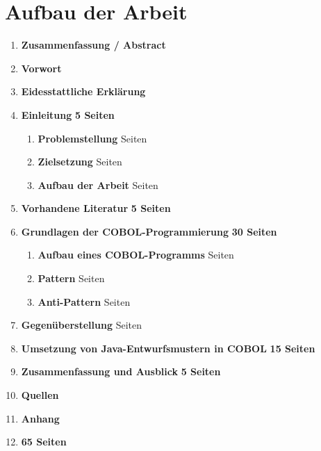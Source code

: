 \section{Aufbau der Arbeit}

\begin{framed}
\begin{enumerate}[label=\arabic*.]
	\item[] \textbf{Zusammenfassung / Abstract}
    \item[] \textbf{Vorwort}
    \item[] \textbf{Eidesstattliche Erklärung}
	\item 
    	\textbf{Einleitung} \dotfill \textbf{5 Seiten}
    	\begin{enumerate}[label=\arabic*.]
    		\item \textbf{Problemstellung}  Seiten
        	\item \textbf{Zielsetzung}  Seiten
            \item \textbf{Aufbau der Arbeit}  Seiten
    	\end{enumerate}
    \item \textbf{Vorhandene Literatur} \dotfill \textbf{5 Seiten}
    \item \textbf{Grundlagen der COBOL-Programmierung} \dotfill \textbf{30 Seiten}
    	\begin{enumerate}[label=\arabic*.]
    	\item \textbf{Aufbau eines COBOL-Programms}  Seiten
        \item \textbf{Pattern}  Seiten
        \item \textbf{Anti-Pattern}  Seiten
    	\end{enumerate}
    \item \textbf{Gegenüberstellung }  Seiten
    \item \textbf{Umsetzung von Java-Entwurfsmustern in COBOL} \dotfill \textbf{15 Seiten}
    \item \textbf{Zusammenfassung und Ausblick} \dotfill \textbf{5 Seiten}
    \item[] \textbf{Quellen}
    \item[] \textbf{Anhang}
    \item[] \hfill \textbf{65 Seiten}
\end{enumerate}
\end{framed}